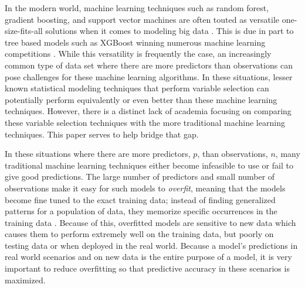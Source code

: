 \documentclass[final,onefignum,onetabnum]{siuro210301}
\begin{document}
	In the modern world, machine learning techniques such as random forest, gradient boosting, and support vector machines are often touted as versatile one-size-fits-all solutions when it comes to modeling big data \cite{nielsen2016tree}. This is due in part to tree based models such as XGBoost winning numerous machine learning competitions \cite{nielsen2016tree}. While this versatility is frequently the case, an increasingly common type of data set where there are more predictors than observations can pose challenges for these machine learning algorithms. In these situations, lesser known statistical modeling techniques that perform variable selection can potentially perform equivalently or even better than these machine learning techniques. However, there is a distinct lack of academia focusing on comparing these variable selection techniques with the more traditional machine learning techniques. This paper serves to help bridge that gap.
	
	
	
	In these situations where there are more predictors, $p$, than observations, $n$, many traditional machine learning techniques either become infeasible to use or fail to give good predictions. The large number of predictors and small number of observations make it easy for such models to \textit{overfit}, meaning that the models become fine tuned to the exact training data; instead of finding generalized patterns for a population of data, they memorize specific occurrences in the training data \cite{james2013introduction, friedman2001elements}. Because of this, overfitted models are sensitive to new data which causes them to perform extremely well on the training data, but poorly on testing data or when deployed in the real world. Because a model's predictions in real world scenarios and on new data is the entire purpose of a model, it is very important to reduce overfitting so that predictive accuracy in these scenarios is maximized.
	
\end{document}
